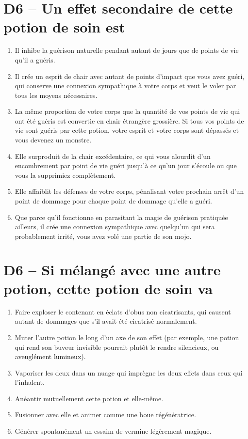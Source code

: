 \documentclass{article}
\begin{document}
\section*{D6 -- Un effet secondaire de cette potion de soin est}
\begin{enumerate}
	\item Il inhibe la guérison naturelle pendant autant de jours que de points de vie qu'il a guéris.
	\item Il crée un esprit de chair avec autant de points d'impact que vous avez guéri, qui conserve une connexion sympathique à votre corps et veut le voler par tous les moyens nécessaires.
	\item La même proportion de votre corps que la quantité de vos points de vie qui ont été guéris est convertie en chair étrangère grossière. Si tous vos points de vie sont guéris par cette potion, votre esprit et votre corps sont dépassés et vous devenez un monstre.
	\item Elle surproduit de la chair excédentaire, ce qui vous alourdit d'un encombrement par point de vie guéri jusqu'à ce qu'un jour s'écoule ou que vous la supprimiez complètement.
	\item Elle affaiblit les défenses de votre corps, pénalisant votre prochain arrêt d'un point de dommage pour chaque point de dommage qu'elle a guéri.
	\item Que parce qu'il fonctionne en parasitant la magie de guérison pratiquée ailleurs, il crée une connexion sympathique avec quelqu'un qui sera probablement irrité, vous avez volé une partie de son mojo.
\end{enumerate}

\section*{D6 -- Si mélangé avec une autre potion, cette potion de soin va}
\begin{enumerate}
	\item Faire exploser le contenant en éclats d'obus non cicatrisants, qui causent autant de dommages que s'il avait été cicatrisé normalement.
	\item Muter l'autre potion le long d'un axe de son effet (par exemple, une potion qui rend son buveur invisible pourrait plutôt le rendre silencieux, ou aveuglément lumineux).
	\item Vaporiser les deux dans un nuage qui imprègne les deux effets dans ceux qui l'inhalent.
	\item Anéantir mutuellement cette potion et elle-même.
	\item Fusionner avec elle et animer comme une boue régénératrice.
	\item Générer spontanément un essaim de vermine légèrement magique.
\end{enumerate}
\end{document}
